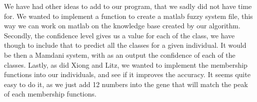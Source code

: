 \documentclass[a4paper,12pt]{article}
\begin{document}
We have had other ideas to add to our program, that we sadly did not have time for.
We wanted to implement a function to create a matlab fuzzy system file, this way we can work on matlab on the knowledge base created by our algorithm.
Secondly, the confidence level gives us a value for each of the class, we have though to include that to predict all the classes for a given individual. It would be then a Mamdani system, with as an output the confidence of each of the classes.
Lastly, as did Xiong and Litz, we wanted to implement the membership functions into our individuals, and see if it improves the accuracy. It seems quite easy to do it, as we just add 12 numbers into the gene that will match the peak of each membership functions.

 


\end{document}
